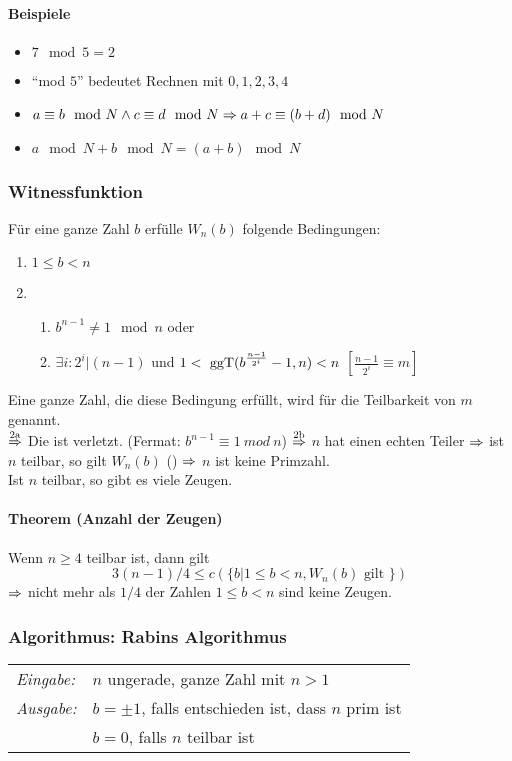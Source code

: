 \documentclass[a4paper]{scrartcl}
\begin{document}
\paragraph{Beispiele}
\begin{itemize}
	\item $7 \mod 5 = 2$
	\item "`mod $5$"' bedeutet Rechnen mit $0,1,2,3,4$
	\item $a \equiv b \mod N \wedge c \equiv d \mod N \Rightarrow a+c \equiv (b+d) \mod N$
	\item $a \mod N + b \mod N = (a+b) \mod N$
\end{itemize}

\subsubsection{Witnessfunktion}
Für eine ganze Zahl $b$ erfülle $W_n(b)$ folgende Bedingungen:
\begin{enumerate}
	\item $1 \le b < n$
	\item 
		\begin{enumerate}
			\item $b^{n-1} \neq 1 \mod n$ oder
			\item $\exists i:2^i|(n-1)$ und $1<\text{ ggT}(b^{\frac{n-1}{2^i}}-1,n)<n$ $\left[\frac{n-1}{2^i}\equiv m\right]$
		\end{enumerate}
	\end{enumerate}
Eine ganze Zahl, die diese Bedingung erfüllt, wird  für die Teilbarkeit von $m$ genannt.\\
$\stackrel{\text{2a}}{\Rightarrow}$ Die  ist verletzt. (Fermat: $b^{n-1}\equiv1\ mod\ n$)
$\stackrel{\text{2b}}{\Rightarrow}$ $n$ hat einen echten Teiler 
$\Rightarrow$ ist $n$ teilbar, so gilt $W_n(b)$ ()
$\Rightarrow$ $n$ ist keine Primzahl.\\
Ist $n$ teilbar, so gibt es viele Zeugen.

\paragraph{Theorem (Anzahl der Zeugen)}
Wenn $n \ge 4$ teilbar ist, dann gilt
$${3(n-1)}/4 \le c(\{b|1\le b<n, W_n(b) \text{ gilt }\})$$
$\Rightarrow$ nicht mehr als $1/4$ der Zahlen $1 \le b <n$ sind keine Zeugen.\\

\subsubsection{Algorithmus: Rabins Algorithmus}
\begin{tabular}{ll}
	\emph{Eingabe:} & $n$ ungerade, ganze Zahl mit $n>1$ \\
	\emph{Ausgabe:} & $b=\pm 1$, falls entschieden ist, dass $n$ prim ist\\
	                & $b=0$, falls $n$ teilbar ist\\
\end{tabular}\bigskip
\end{document}
